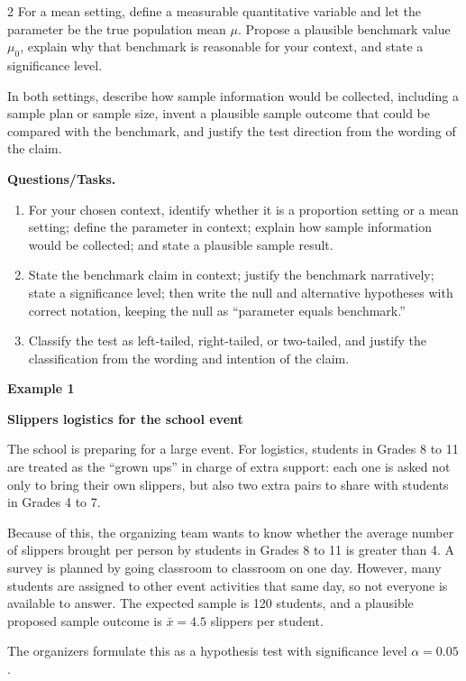\documentclass[12pt]{article}
\newcommand{\SubsectionBox}[1]{%
\noindent\colorbox{gray!30}{%
\parbox{\linewidth}{\textbf{#1}}%
}\par\vspace{0.35cm}%
}
\begin{document}
\begin{multicols}{2}
For a mean setting, define a measurable quantitative variable and let the parameter be the true population mean \(\mu\). Propose a plausible benchmark value \(\mu_0\), explain why that benchmark is reasonable for your context, and state a significance level.

In both settings, describe how sample information would be collected, including a sample plan or sample size, invent a plausible sample outcome that could be compared with the benchmark, and justify the test direction from the wording of the claim.

\textbf{Questions/Tasks.}
\begin{enumerate}
\item[(C1)] For your chosen context, identify whether it is a proportion setting or a mean setting; define the parameter in context; explain how sample information would be collected; and state a plausible sample result.
\item[(C2)] State the benchmark claim in context; justify the benchmark narratively; state a significance level; then write the null and alternative hypotheses with correct notation, keeping the null as ``parameter equals benchmark.''
\item[(C3)] Classify the test as left-tailed, right-tailed, or two-tailed, and justify the classification from the wording and intention of the claim.
\end{enumerate}

\vspace{0.25cm}
\SubsectionBox{Example 1}\vspace{-0.25cm}

\textbf{Slippers logistics for the school event}

The school is preparing for a large event. For logistics, students in Grades 8 to 11 are treated as the ``grown ups'' in charge of extra support: each one is asked not only to bring their own slippers, but also two extra pairs to share with students in Grades 4 to 7.

Because of this, the organizing team wants to know whether the average number of slippers brought per person by students in Grades 8 to 11 is greater than 4. A survey is planned by going classroom to classroom on one day. However, many students are assigned to other event activities that same day, so not everyone is available to answer. The expected sample is 120 students, and a plausible proposed sample outcome is \(\bar{x}=4.5\) slippers per student.

The organizers formulate this as a hypothesis test with significance level \(\alpha=0.05\).


\end{multicols}
\end{document}
